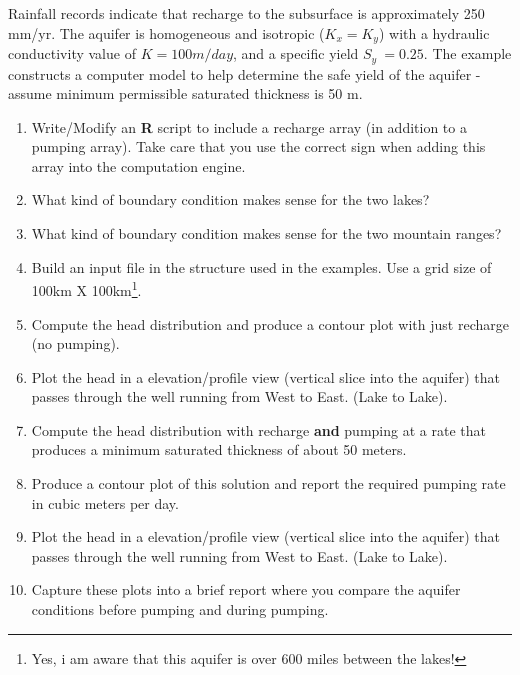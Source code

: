 \begin{enumerate}
Rainfall records indicate that recharge to the subsurface is approximately 250 mm/yr.  
The aquifer is homogeneous and isotropic ($K_x = K_y$) with a hydraulic conductivity value of $K=100m/day$, and a specific yield $S_y~=0.25$.  The example constructs a computer model to help determine the safe yield of the aquifer - assume minimum permissible saturated thickness is 50 m.
\begin{enumerate}
\item Write/Modify an \textbf{R} script to include a recharge array (in addition to a pumping array).  
Take care that you use the correct sign when adding this array into the computation engine.
\item What kind of boundary condition makes sense for the two lakes?
\item What kind of boundary condition makes sense for the two mountain ranges?
\item Build an input file in the structure used in the examples.  
Use a grid size of 100km X 100km\footnote{Yes, i am aware that this aquifer is over 600 miles between the lakes!}.
\item Compute the head distribution and produce a contour plot with just recharge (no pumping).
\item Plot the head in a elevation/profile view (vertical slice into the aquifer) that passes through the well running from West to East. (Lake to Lake).
\item Compute the head distribution with recharge \textbf{and} pumping at a rate that produces a minimum saturated thickness of about 50 meters.
\item Produce a contour plot of this solution and report the required pumping rate in cubic meters per day. 
\item Plot the head in a elevation/profile view (vertical slice into the aquifer) that passes through the well running from West to East. (Lake to Lake).
\item Capture these plots into a brief report where you compare the aquifer conditions before pumping and during pumping.
\end{enumerate}

\end{enumerate}

